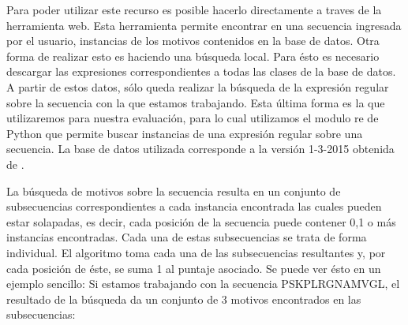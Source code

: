 

Para poder utilizar este recurso es posible hacerlo directamente a traves de la herramienta web\cite{elmweb}. 
Esta herramienta permite encontrar en una secuencia ingresada por el usuario, instancias de los motivos contenidos en la base de datos.
Otra forma de realizar esto es haciendo una búsqueda local. Para ésto es necesario descargar las expresiones correspondientes a todas las clases de la base de datos. 
A partir de estos datos, sólo queda realizar la búsqueda de la expresión regular sobre la secuencia con la que estamos trabajando.
Esta última forma es la que utilizaremos para nuestra evaluación, para lo cual utilizamos el modulo re de Python que permite buscar instancias de una expresión regular sobre una secuencia.
La base de datos utilizada corresponde a la versión 1-3-2015 obtenida de \cite{elmweb}.

La búsqueda de motivos sobre la secuencia resulta en un conjunto de subsecuencias correspondientes a cada instancia encontrada las cuales pueden estar solapadas, es decir, cada posición de la secuencia puede contener 0,1 o más instancias encontradas. 
Cada una de estas subsecuencias se trata de forma individual.
El algoritmo toma cada una de las subsecuencias resultantes y, por cada posición de éste, se suma 1 al puntaje asociado.
Se puede ver ésto en un ejemplo sencillo:
Si estamos trabajando con la secuencia PSKPLRGNAMVGL, el resultado de la búsqueda da un conjunto de 3 motivos encontrados en las subsecuencias:
% 

